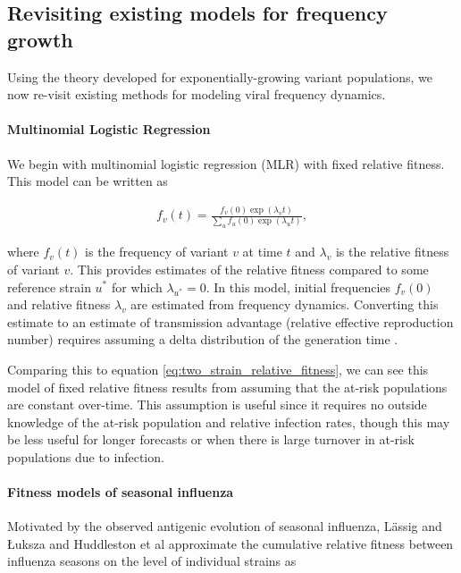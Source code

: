 \documentclass[12pt,oneside,letterpaper]{article}
\begin{document}
\subsection{Revisiting existing models for frequency growth}

Using the theory developed for exponentially-growing variant populations, we now re-visit existing methods for modeling viral frequency dynamics.

\paragraph{Multinomial Logistic Regression}%

We begin with multinomial logistic regression (MLR) with fixed relative fitness.
This model can be written as

\begin{align*}
    f_{v}(t) = \frac{f_{v}(0) \exp(\lambda_{v} t)}{\sum_{u} f_{u}(0) \exp(\lambda_{u} t)},
\end{align*}

where $f_{v}(t)$ is the frequency of variant $v$ at time $t$ and $\lambda_{v}$ is the relative fitness of variant $v$.
This provides estimates of the relative fitness compared to some reference strain $u^{*}$ for which $\lambda_{u^*} = 0$.
In this model, initial frequencies $f_{v}(0)$ and relative fitness $\lambda_{v}$ are estimated from frequency dynamics.
Converting this estimate to an estimate of transmission advantage (relative effective reproduction number) requires assuming a delta distribution of the generation time \cite{Wallinga2006}.

Comparing this to equation \ref{eq:two_strain_relative_fitness}, we can see this model of fixed relative fitness results from assuming that the at-risk populations are constant over-time.
This assumption is useful since it requires no outside knowledge of the at-risk population and relative infection rates, though this may be less useful for longer forecasts or when there is large turnover in at-risk populations due to infection.

\paragraph{Fitness models of seasonal influenza}%

Motivated by the observed antigenic evolution of seasonal influenza, L{\"a}ssig and {\L}uksza \cite{luksza2014predictive} and Huddleston et al \cite{Huddleston2020} approximate the cumulative relative fitness between influenza seasons on the level of individual strains as
\end{document}
